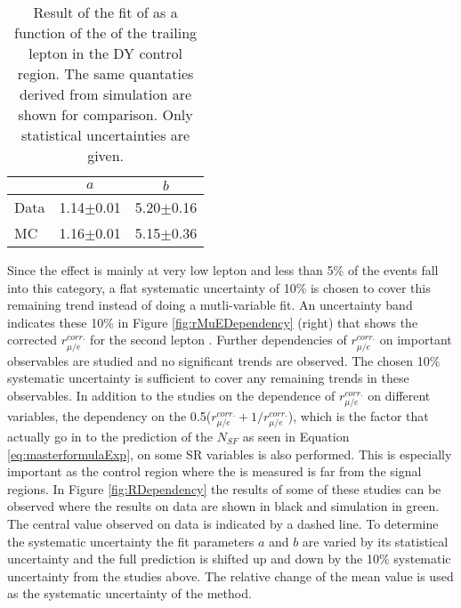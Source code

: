 \begin{table}[ht!]
\def\arraystretch{1.2}
\setlength{\belowcaptionskip}{6pt} 
\small                            
\centering                           
\caption{Result of the fit of \rmue as a function of the \pt of the trailing lepton in the DY control region. The same quantaties derived from simulation are shown for comparison. Only statistical uncertainties are given.}
\label{tab:rMuEFitParameters}
\begin{tabular}{ l c c }
        \hline \hline
    		& $a$ & $b$ \\\hline
        Data     &  1.14$\pm$0.01  &  5.20$\pm$0.16    \\
        MC       &  1.16$\pm$0.01  &  5.15$\pm$0.36    \\\hline\hline
\end{tabular}
\end{table}                                                                                                                                                                   
Since the effect is mainly at very low lepton \pt and less than 5\% of the events fall into this category, a flat systematic uncertainty of 10\% is chosen to cover this remaining trend 
instead of doing a mutli-variable fit. 
An uncertainty band indicates these 10\% in Figure \ref{fig:rMuEDependency} (right) that shows the corrected $r_{\mu/e}^{corr.}$ for the second lepton \pt. 
Further dependencies of $r_{\mu/e}^{corr.}$ on important observables are studied and no significant trends are observed. 
The chosen 10\% systematic uncertainty is sufficient to cover any remaining trends in these observables.
In addition to the studies on the dependence of $r_{\mu/e}^{corr.}$ on different variables, the dependency on the 0.5($r_{\mu/e}^{corr.}+1/r_{\mu/e}^{corr.}$), which is the factor that actually go in to the prediction of the $N_{SF}$ as seen in Equation \ref{eq:masterformulaExp}, on some SR variables is also performed. 
This is especially important as the control region where the \rmue is measured is far from the signal regions. 
In Figure \ref{fig:RDependency} the results of some of these studies can be observed where the results on data are shown in black and simulation in green. 
The central value observed on data is indicated by a dashed line. 
To determine the systematic uncertainty the fit parameters $a$ and $b$ are varied by its statistical uncertainty and the full prediction is shifted up and down by the 10\% systematic uncertainty from the studies above.
The relative change of the mean value is used as the systematic uncertainty of the method. 
